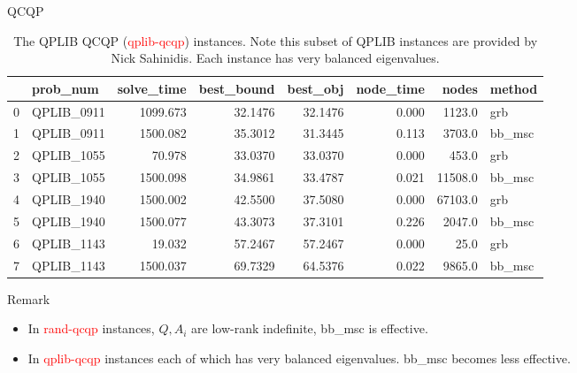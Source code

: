 \documentclass[aspectratio=1610, 9pt]{beamer}
\newcommand{\redsf}[1]{\textcolor{red}{\textsf{#1}}}
\begin{document}
\begin{frame}[standout]{QCQP}
  \begin{table}[h!]
    \begin{tabular}{llrrrrrl}
      \toprule
      {} & prob\_num   & solve\_time & best\_bound & best\_obj & node\_time & nodes   & method  \\
      \midrule
      0  & QPLIB\_0911 & 1099.673    & 32.1476     & 32.1476   & 0.000      & 1123.0  & grb     \\
      1  & QPLIB\_0911 & 1500.082    & 35.3012     & 31.3445   & 0.113      & 3703.0  & bb\_msc \\
      2  & QPLIB\_1055 & 70.978      & 33.0370     & 33.0370   & 0.000      & 453.0   & grb     \\
      3  & QPLIB\_1055 & 1500.098    & 34.9861     & 33.4787   & 0.021      & 11508.0 & bb\_msc \\
      4  & QPLIB\_1940 & 1500.002    & 42.5500     & 37.5080   & 0.000      & 67103.0 & grb     \\
      5  & QPLIB\_1940 & 1500.077    & 43.3073     & 37.3101   & 0.226      & 2047.0  & bb\_msc \\
      6  & QPLIB\_1143 & 19.032      & 57.2467     & 57.2467   & 0.000      & 25.0    & grb     \\
      7  & QPLIB\_1143 & 1500.037    & 69.7329     & 64.5376   & 0.022      & 9865.0  & bb\_msc \\
      \bottomrule
    \end{tabular}
    \caption{The QPLIB QCQP (\redsf{qplib-qcqp}) instances. Note this subset of QPLIB instances are provided by Nick Sahinidis. Each instance has very balanced eigenvalues.}
  \end{table}

  \normalsize
  Remark
  \begin{itemize}
    \item In \redsf{rand-qcqp} instances, \(Q, A_i\) are low-rank indefinite, bb\_msc is effective.
    \item In \redsf{qplib-qcqp} instances each of which has very balanced eigenvalues. bb\_msc becomes less effective.
  \end{itemize}
\end{frame}
\end{document}
